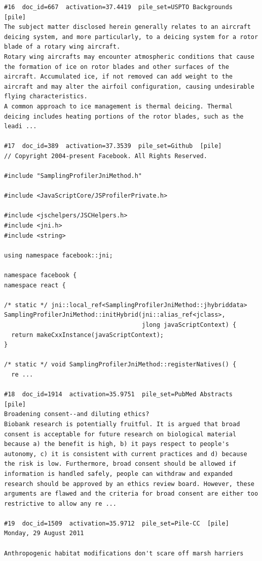 \begin{verbatim}
#16  doc_id=667  activation=37.4419  pile_set=USPTO Backgrounds  [pile]
The subject matter disclosed herein generally relates to an aircraft deicing system, and more particularly, to a deicing system for a rotor blade of a rotary wing aircraft.
Rotary wing aircrafts may encounter atmospheric conditions that cause the formation of ice on rotor blades and other surfaces of the aircraft. Accumulated ice, if not removed can add weight to the aircraft and may alter the airfoil configuration, causing undesirable flying characteristics.
A common approach to ice management is thermal deicing. Thermal deicing includes heating portions of the rotor blades, such as the leadi ...

#17  doc_id=389  activation=37.3539  pile_set=Github  [pile]
// Copyright 2004-present Facebook. All Rights Reserved.

#include "SamplingProfilerJniMethod.h"

#include <JavaScriptCore/JSProfilerPrivate.h>

#include <jschelpers/JSCHelpers.h>
#include <jni.h>
#include <string>

using namespace facebook::jni;

namespace facebook {
namespace react {

/* static */ jni::local_ref<SamplingProfilerJniMethod::jhybriddata>
SamplingProfilerJniMethod::initHybrid(jni::alias_ref<jclass>,
                                      jlong javaScriptContext) {
  return makeCxxInstance(javaScriptContext);
}

/* static */ void SamplingProfilerJniMethod::registerNatives() {
  re ...

#18  doc_id=1914  activation=35.9751  pile_set=PubMed Abstracts  [pile]
Broadening consent--and diluting ethics?
Biobank research is potentially fruitful. It is argued that broad consent is acceptable for future research on biological material because a) the benefit is high, b) it pays respect to people's autonomy, c) it is consistent with current practices and d) because the risk is low. Furthermore, broad consent should be allowed if information is handled safely, people can withdraw and expanded research should be approved by an ethics review board. However, these arguments are flawed and the criteria for broad consent are either too restrictive to allow any re ...

#19  doc_id=1509  activation=35.9712  pile_set=Pile-CC  [pile]
Monday, 29 August 2011

Anthropogenic habitat modifications don't scare off marsh harriers


\end{verbatim}
